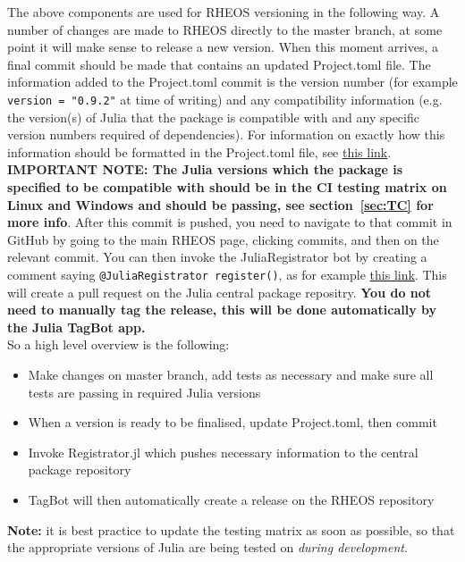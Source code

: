 \documentclass[]{article}
\newcommand{\link}[2]{{\color{blue}\href{#1}{#2}}}
\newcommand{\cod}[1]{\colorbox{light-light-gray}{\texttt{#1}}}
\begin{document}
The above components are used for RHEOS versioning in the following way. A number of changes are made to RHEOS directly to the master branch, at some point it will make sense to release a new version. When this moment arrives, a final commit should be made that contains an updated Project.toml file. The information added to the Project.toml commit is the version number (for example \cod{version = "0.9.2"} at time of writing) and any compatibility information (e.g. the version(s) of Julia that the package is compatible with and any specific version numbers required of dependencies). For information on exactly how this information should be formatted in the Project.toml file, see \link{https://julialang.github.io/Pkg.jl/v1/compatibility/index.html}{this link}. \textbf{IMPORTANT NOTE: The Julia versions which the package is specified to be compatible with should be in the CI testing matrix on Linux and Windows and should be passing, see section~\ref{sec:TC} for more info}. After this commit is pushed, you need to navigate to that commit in GitHub by going to the main RHEOS page, clicking commits, and then on the relevant commit. You can then invoke the JuliaRegistrator bot by creating a comment saying \cod{@JuliaRegistrator register()}, as for example \link{https://github.com/JuliaRheology/RHEOS.jl/commit/e2e63c299615a32ab2d7e055484b3efc662544c4}{this link}. This will create a pull request on the Julia central package repositry. \textbf{You do not need to manually tag the release, this will be done automatically by the Julia TagBot app.}\\
\newpage
So a high level overview is the following:
\begin{itemize}
	\item Make changes on master branch, add tests as necessary and make sure all tests are passing in required Julia versions
	\item When a version is ready to be finalised, update Project.toml, then commit
	\item Invoke Registrator.jl which pushes necessary information to the central package repository
	\item TagBot will then automatically create a release on the RHEOS repository
\end{itemize}

\textbf{Note:} it is best practice to update the testing matrix as soon as possible, so that the appropriate versions of Julia are being tested on \textit{during development}.
\end{document}
